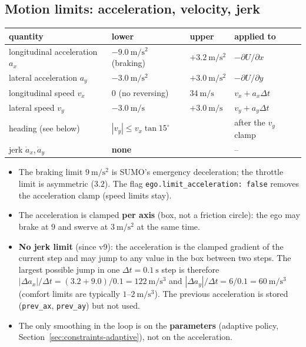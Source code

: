 \documentclass[11pt,a4paper]{article}
\begin{document}
\subsection{Motion limits: acceleration, velocity, jerk}
\begin{center}
\small
\begin{tabular}{llll}
  \toprule
  quantity & lower & upper & applied to \\
  \midrule
  longitudinal acceleration $a_x$ & $-9.0~\mathrm{m/s^2}$ (braking) & $+3.2~\mathrm{m/s^2}$ & $-\partial U/\partial x$ \\
  lateral acceleration $a_y$      & $-3.0~\mathrm{m/s^2}$ & $+3.0~\mathrm{m/s^2}$ & $-\partial U/\partial y$ \\
  longitudinal speed $v_x$        & $0$ (no reversing) & $34~\mathrm{m/s}$ & $v_x + a_x \Delta t$ \\
  lateral speed $v_y$             & $-3.0~\mathrm{m/s}$ & $+3.0~\mathrm{m/s}$ & $v_y + a_y \Delta t$ \\
  heading (see below)             & \multicolumn{2}{l}{$|v_y| \le v_x \tan 15^\circ$} & after the $v_y$ clamp \\
  jerk $\dot a_x, \dot a_y$       & \multicolumn{2}{l}{\textbf{none}} & -- \\
  \bottomrule
\end{tabular}
\end{center}
\begin{itemize}
  \item The braking limit $9~\mathrm{m/s^2}$ is SUMO's emergency deceleration; the throttle limit is asymmetric
        ($3.2$). The flag \texttt{ego.limit\_acceleration: false} removes the acceleration clamp (speed limits stay).
  \item The acceleration is clamped \textbf{per axis} (box, not a friction circle): the ego may brake at
        $9$ and swerve at $3~\mathrm{m/s^2}$ at the same time.
  \item \textbf{No jerk limit} (since v9): the acceleration is the clamped gradient of the current step and may
        jump to any value in the box between two steps. The largest possible jump in one
        $\Delta t = 0.1~\mathrm{s}$ step is therefore
        $|\Delta a_x|/\Delta t = (3.2 + 9.0)/0.1 = 122~\mathrm{m/s^3}$ and
        $|\Delta a_y|/\Delta t = 6/0.1 = 60~\mathrm{m/s^3}$ (comfort limits are typically $1$--$2~\mathrm{m/s^3}$).
        The previous acceleration is stored (\texttt{prev\_ax}, \texttt{prev\_ay}) but not used.
  \item The only smoothing in the loop is on the \textbf{parameters} (adaptive policy, Section~\ref{sec:constraints-adaptive}),
        not on the acceleration.
\end{itemize}
\end{document}
